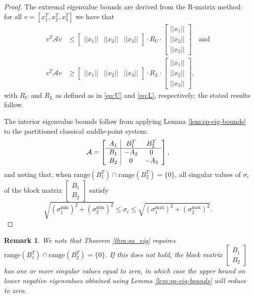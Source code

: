 \documentclass{article}
\newtheorem{remark}{Remark}
\newcommand{\range}{\mathrm{range}}
\newcommand{\sA}{\mathcal{A}}
\begin{document}
\begin{proof}
    The extremal eigenvalue bounds are derived from the R-matrix method: for all $v = [x_1^T, x_2^T, x_3^T]$ we have that
    \begin{align*}
    v^T \sA v &\le \begin{bmatrix} ||x_1|| & ||x_2|| & ||x_3|| \end{bmatrix} \cdot  R_U \cdot \begin{bmatrix} ||x_1|| \\ ||x_2|| \\ ||x_3|| \end{bmatrix} \quad \textrm{and}\\
    v^T \sA v &\ge \begin{bmatrix} ||x_1|| & ||x_2|| & ||x_3|| \end{bmatrix} \cdot R_L \cdot \begin{bmatrix} ||x_1|| \\ ||x_2|| \\ ||x_3|| \end{bmatrix},
    \end{align*}
    with $R_U$ and $R_L$ as defined as in \eqref{eq:U} and \eqref{eq:L}, respectively; the stated results follow.

    The interior eigenvalue bounds follow from applying Lemma \ref{lem:sp-eig-bounds} to the partitioned classical saddle-point system:
    \[
    \sA = \left[ \begin{array}{c | c c}
        A_1 & B_1^T & B_2^T \\
        \hline
        B_1 & -A_2 & 0 \\
        B_2 & 0 & -A_3
    \end{array} \right],
    \]
    and noting that, when $\range(B_1^T) \cap \range(B_2^T) = \{0\}$, all singular values of $\sigma_i$ of the block matrix $\begin{bmatrix}
        B_1 \\
        B_2
    \end{bmatrix}$ satisfy
    \[
    \sqrt{(\sigma_{1}^{\min})^2 + (\sigma_{2}^{\min})^2} \le \sigma_i \le \sqrt{(\sigma_{1}^{\max})^2 + (\sigma_{2}^{\max})^2}.
    \]
\end{proof}

\begin{remark}
    We note that Theorem \ref{thm:sa_eig} requires $\range(B_1^T) \cap \range(B_2^T) = \{ 0\}$. If this does not hold, the block matrix $\begin{bmatrix}
        B_1 \\
        B_2
    \end{bmatrix}$
    has one or more singular values equal to zero, in which case the upper bound on lower negative eigenvalues obtained using Lemma \ref{lem:sp-eig-bounds} will reduce to zero.
\end{remark}
\end{document}
